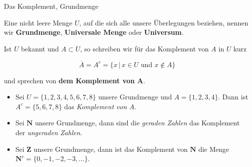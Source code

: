 \documentclass[12pt,ngerman,a4paper,ignorenonframetext,]{beamer}
\providecommand{\tightlist}{%
  \setlength{\itemsep}{0pt}\setlength{\parskip}{0pt}}
\begin{document}
\begin{frame}{Das Komplement, Grundmenge}
\protect\hypertarget{das-komplement-grundmenge}{}


\begin{definition}[Grundmenge]

Eine nicht leere Menge \(U\), auf die sich alle unsere Überlegungen
beziehen, nennen wir \textbf{Grundmenge}, \textbf{Universale Menge} oder
\textbf{Universum}.

\end{definition}


\begin{definition}

Ist \(U\) bekannt und \(A \subset U\), so schreiben wir für das
Komplement von \(A\) in \(U\) kurz

\[ \overline{A} = A^c = \{x \, | \, x \in U \text{ und } x \notin A\} \]

und sprechen von \textbf{dem Komplement von A}.

\end{definition}


\begin{Beispiele}[]

{\small{}

\begin{itemize}
\tightlist
\item
  Sei \(U=\{1,2 , 3, 4, 5, 6, 7, 8\}\) unsere Grundmenge und
  \(A=\{1, 2, 3, 4\}\). Dann ist \(A^c=\{5, 6, 7, 8\}\) das
  \emph{Komplement von \(A\)}.
\item
  Sei \(\mathbf{N}\) unsere Grundmenge, dann sind die \emph{geraden
  Zahlen} das Komplement der \emph{ungeraden Zahlen}.
\item
  Sei \(\mathbf{Z}\) unsere Grundmenge, dann ist das Komplement von
  \(\mathbf{N}\) die Menge \(\mathbf{N}^c=\{0,-1,-2,-3, ...\}\).
\end{itemize}

}

\end{Beispiele}

\end{frame}
\end{document}
